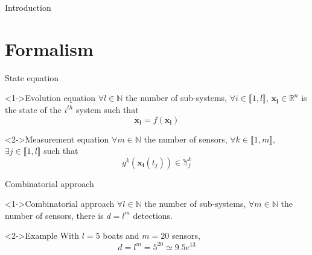 \documentclass{beamer}
\begin{document}
\begin{frame}{Introduction}
        \end{frame}

    \section{Formalism}

        \begin{frame}{State equation}
            \begin{block}<1->{Evolution equation}
                $\forall l \in \mathbb{N}$ the number of sub-systems, $\forall i \in \llbracket 1, l\rrbracket$, $\mathbf{x_i} \in \mathbb{R}^n$ is the state of the $i^{th}$ system such that
                \begin{equation}
                    \dot{\mathbf{x_i}} = f(\mathbf{x_i})
                \end{equation}
            \end{block}

            \begin{block}<2->{Measurement equation}
                $\forall m \in \mathbb{N}$ the number of sensors, $\forall k \in \llbracket 1, m\rrbracket$, $\exists j \in \llbracket 1, l\rrbracket$ such that
                \begin{equation}
                    g^k(\mathbf{x_i}(t_j)) \in \mathbb{Y}_j^k
                \end{equation}
            \end{block}
        \end{frame}

        \begin{frame}{Combinatorial approach}
            \begin{block}<1->{Combinatorial approach}
                $\forall l \in \mathbb{N}$ the number of sub-systems, $\forall m \in \mathbb{N}$ the number of sensors, there is $d = l^m$ detections.
            \end{block}
            \begin{exampleblock}<2->{Example}
                With $l = 5$ boats and $m = 20$ sensors,
                $$d = l^m = 5^{20} \simeq 9.5e^{13}$$
            \end{exampleblock}
        \end{frame}
\end{document}
